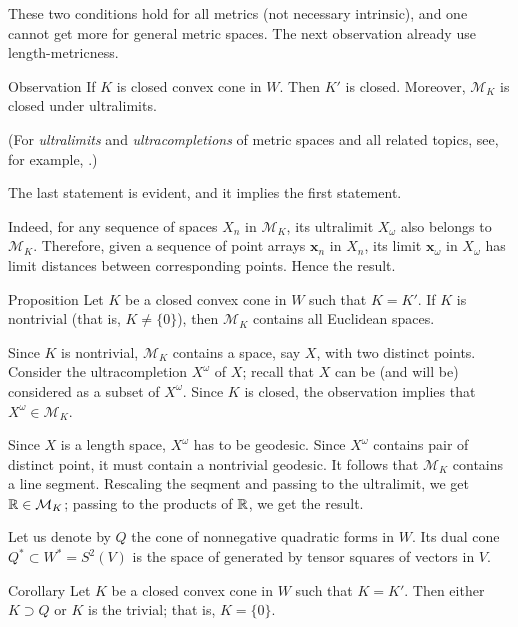 \documentclass[a4paper,10pt]{article}
\begin{document}
These two conditions hold for all metrics (not necessary intrinsic),
and one cannot get more for general metric spaces.
The next observation already use length-metricness.

\begin{thm}{Observation}
If $K$ is closed convex cone in $W$.
Then $K'$ is closed.
Moreover, $\mathcal{M}_K$ is closed under ultralimits.
\end{thm}


(For \emph{ultralimits} and \emph{ultracompletions} of metric spaces and all related topics, see, for example, \cite{petrunin2023}.)

The last statement is evident, and it implies the first statement.

Indeed, for any sequence of spaces $X_n$ in $\mathcal{M}_K$, its ultralimit $X_\omega$ also belongs to $\mathcal{M}_K$.
Therefore, given a sequence of point arrays $\bm{x}_n$ in $X_n$,
its limit $\bm{x}_\omega$ in $X_\omega$ has limit distances between corresponding points.
Hence the result.
\qeds

\begin{thm}{Proposition}\label{prop:Associated form}
Let $K$ be a closed convex cone in $W$ such that $K=K'$.
If $K$ is nontrivial (that is, $K\ne \{0\}$), then $\mathcal{M}_K$ contains all Euclidean spaces.
\end{thm}

Since $K$ is nontrivial, $\mathcal{M}_K$ contains a space, say $X$, with two distinct points.
Consider the ultracompletion $X^\omega$ of $X$;
recall that $X$ can be (and will be) considered as a subset of $X^\omega$.
Since $K$ is closed, the observation implies that $X^\omega\in \mathcal{M}_K$.

Since  $X$ is a length space, $X^\omega$ has to be geodesic.
Since $X^\omega$ contains pair of distinct point, it must contain a nontrivial geodesic.
It follows that $\mathcal{M}_K$ contains a line segment.
Rescaling the seqment and passing to the ultralimit, we get $\mathbb{R}\in \mathcal{M}_K$;
passing to the products of $\mathbb{R}$, we get the result. 
\qeds

Let us denote by $Q$ the cone of nonnegative quadratic forms in $W$.
Its dual cone $Q^*\subset W^*=S^2(V)$ is the space of generated by tensor squares of vectors in $V$. 

\begin{thm}{Corollary}
Let $K$ be a closed convex cone in $W$ such that $K=K'$.
Then either $K\supset Q$ or $K$ is the trivial; that is, $K=\{0\}$.
\end{thm}
\end{document}
